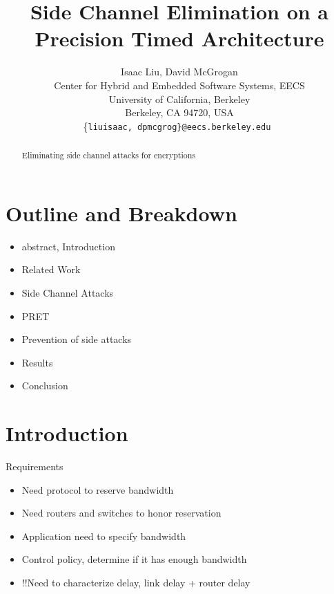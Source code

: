 \documentclass[times, 10pt,twocolumn]{article}
\begin{document}
  \title{Side Channel Elimination on a Precision Timed Architecture}

  \author{Isaac Liu, David McGrogan \\
    Center for Hybrid and Embedded Software Systems, EECS \\
    University of California, Berkeley \\
    Berkeley, CA 94720, USA \\
    \{\tt liuisaac, dpmcgrog\}@eecs.berkeley.edu
  }


\maketitle
\thispagestyle{empty}

\begin{abstract}
Eliminating side channel attacks for encryptions
\end{abstract}


\section{Outline and Breakdown}
\begin{itemize}
\item abstract, Introduction  
\item Related Work
\item Side Channel Attacks
\item PRET  
\item Prevention of side attacks
\item Results  
\item Conclusion  
\end{itemize}

\section{Introduction}
Requirements
\begin{itemize}
\item Need protocol to reserve bandwidth
\item Need routers and switches to honor reservation
\item Application need to specify bandwidth
\item Control policy, determine if it has enough bandwidth
\item !!Need to characterize delay, link delay + router delay
\end{itemize}
\end{document}
